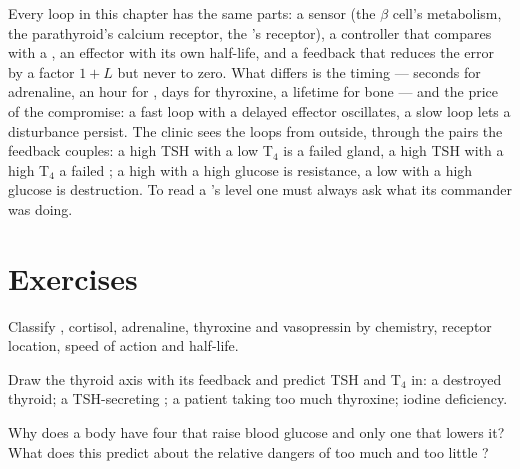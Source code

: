 \begin{remark}\label{rem:b3:endocrinology:control}
Every loop in this chapter has the same parts: a sensor (the
$\beta$ cell's metabolism, the parathyroid's calcium receptor, the
's  receptor), a controller that compares with
a , an effector  with its own half-life, and a
feedback that reduces the error by a factor $1 + L$ but never to zero.
What differs is the timing --- seconds for adrenaline, an hour for
, days for thyroxine, a lifetime for bone --- and the price of
the compromise: a fast loop with a delayed effector oscillates, a slow
loop lets a disturbance persist. The clinic sees the loops from
outside, through the pairs the feedback couples: a high TSH with a low
T$_{4}$ is a failed gland, a high TSH with a high T$_{4}$ a failed
; a high  with a high glucose is resistance, a low
 with a high glucose is destruction. To read a 's level
one must always ask what its commander was doing.
\end{remark}

\section{Exercises}

\begin{exercise}[$\star$]\label{exo:b3:endocrinology:1}
Classify , cortisol, adrenaline, thyroxine and vasopressin by
chemistry, receptor location, speed of action and half-life.
\end{exercise}

\begin{exercise}[$\star$]\label{exo:b3:endocrinology:2}
Draw the thyroid axis with its feedback and predict TSH and T$_{4}$ in:
a destroyed thyroid; a TSH-secreting  ; a patient taking
too much thyroxine; iodine deficiency.
\end{exercise}

\begin{exercise}[$\star$]\label{exo:b3:endocrinology:3}
Why does a body have four  that raise blood glucose and only
one that lowers it? What does this predict about the relative dangers
of too much and too little ?
\end{exercise}

